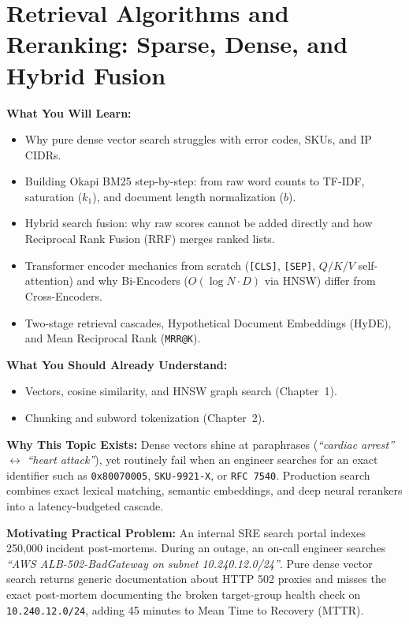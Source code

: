 \chapter{Retrieval Algorithms and Reranking: Sparse, Dense, and Hybrid Fusion}
\label{chap:retrieval}

\begin{chaptergoalsbox}
\textbf{What You Will Learn:}
\begin{itemize}[leftmargin=15pt]
  \item Why pure dense vector search struggles with error codes, SKUs, and IP CIDRs.
  \item Building Okapi BM25 step-by-step: from raw word counts to TF-IDF, saturation ($k_1$), and document length normalization ($b$).
  \item Hybrid search fusion: why raw scores cannot be added directly and how Reciprocal Rank Fusion (RRF) merges ranked lists.
  \item Transformer encoder mechanics from scratch (\texttt{[CLS]}, \texttt{[SEP]}, $Q/K/V$ self-attention) and why Bi-Encoders ($O(\log N \cdot D)$ via HNSW) differ from Cross-Encoders.
  \item Two-stage retrieval cascades, Hypothetical Document Embeddings (HyDE), and Mean Reciprocal Rank (\texttt{MRR@K}).
\end{itemize}

\textbf{What You Should Already Understand:}
\begin{itemize}[leftmargin=15pt]
  \item Vectors, cosine similarity, and HNSW graph search (Chapter~1).
  \item Chunking and subword tokenization (Chapter~2).
\end{itemize}

\textbf{Why This Topic Exists:}
Dense vectors shine at paraphrases (\emph{``cardiac arrest''} $\leftrightarrow$ \emph{``heart attack''}), yet routinely fail when an engineer searches for an exact identifier such as \texttt{0x80070005}, \texttt{SKU-9921-X}, or \texttt{RFC 7540}. Production search combines exact lexical matching, semantic embeddings, and deep neural rerankers into a latency-budgeted cascade.

\textbf{Motivating Practical Problem:}
An internal SRE search portal indexes 250,000 incident post-mortems. During an outage, an on-call engineer searches \emph{``AWS ALB-502-BadGateway on subnet 10.240.12.0/24''}. Pure dense vector search returns generic documentation about HTTP 502 proxies and misses the exact post-mortem documenting the broken target-group health check on \texttt{10.240.12.0/24}, adding 45 minutes to Mean Time to Recovery (MTTR).
\end{chaptergoalsbox}

